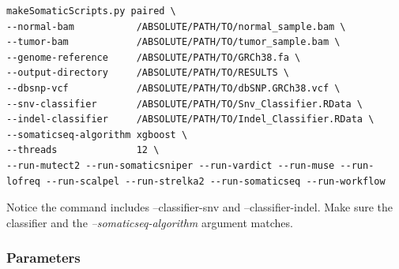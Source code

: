 \documentclass[10pt,letterpaper]{article}
\begin{document}
\begin{sloppypar}
\begin{lstlisting}
makeSomaticScripts.py paired \
--normal-bam           /ABSOLUTE/PATH/TO/normal_sample.bam \
--tumor-bam            /ABSOLUTE/PATH/TO/tumor_sample.bam \
--genome-reference     /ABSOLUTE/PATH/TO/GRCh38.fa \
--output-directory     /ABSOLUTE/PATH/TO/RESULTS \
--dbsnp-vcf            /ABSOLUTE/PATH/TO/dbSNP.GRCh38.vcf \
--snv-classifier       /ABSOLUTE/PATH/TO/Snv_Classifier.RData \
--indel-classifier     /ABSOLUTE/PATH/TO/Indel_Classifier.RData \
--somaticseq-algorithm xgboost \
--threads              12 \
--run-mutect2 --run-somaticsniper --run-vardict --run-muse --run-lofreq --run-scalpel --run-strelka2 --run-somaticseq --run-workflow
\end{lstlisting}

Notice the command includes --classifier-snv and --classifier-indel. Make sure the classifier and the \textit{--somaticseq-algorithm} argument matches. 





\subsubsection{Parameters}


\end{sloppypar}
\end{document}
